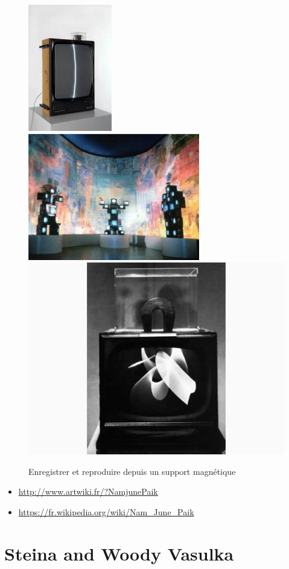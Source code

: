 \documentclass[
  french,
]{book}
\providecommand{\tightlist}{%
  \setlength{\itemsep}{0pt}\setlength{\parskip}{0pt}}
\begin{document}
\begin{figure}

{\centering \includegraphics[width=0.32\linewidth]{medias/corpus/paik/____NamJunepaik_0220452w_namjunepaikzenfortv1961975_vignette_300_209_20150414152312_20150414153250} \includegraphics[width=0.32\linewidth]{medias/corpus/paik/__NamJunepaik_22222_vignette_300_209_20150414121039_20150414121316} \includegraphics[width=0.32\linewidth]{medias/corpus/paik/_NamJunepaik_paik_magnet_tv_20150506194428_20150506194457} 

}

\caption{Enregistrer et reproduire depuis un support magnétique}\label{fig:unnamed-chunk-3}
\end{figure}

\begin{itemize}
\tightlist
\item
  \url{http://www.artwiki.fr/?NamjunePaik}
\item
  \url{https://fr.wikipedia.org/wiki/Nam_June_Paik}
\end{itemize}

\hypertarget{steina-and-woody-vasulka}{%
\section{Steina and Woody Vasulka}\label{steina-and-woody-vasulka}}
\end{document}

